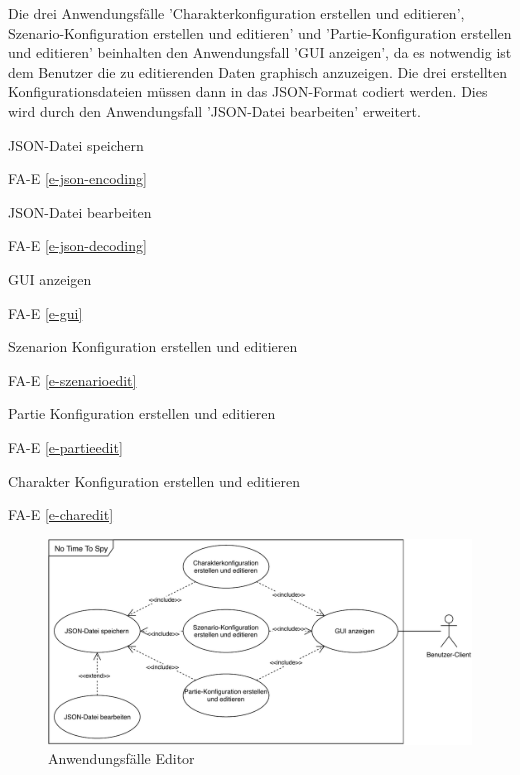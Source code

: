 Die drei Anwendungsfälle 'Charakterkonfiguration erstellen und editieren', Szenario-Konfiguration erstellen und editieren' und 'Partie-Konfiguration erstellen und editieren' beinhalten den Anwendungsfall 'GUI anzeigen', da es notwendig ist dem Benutzer die zu editierenden Daten graphisch anzuzeigen. Die drei erstellten Konfigurationsdateien müssen dann in das JSON-Format codiert werden. Dies wird durch den Anwendungsfall 'JSON-Datei bearbeiten' erweitert.


JSON-Datei speichern

FA-E \ref{e-json-encoding} %

JSON-Datei bearbeiten

FA-E \ref{e-json-decoding} %

GUI anzeigen

FA-E \ref{e-gui} %

Szenarion Konfiguration erstellen und editieren

FA-E \ref{e-szenarioedit} %

Partie Konfiguration erstellen und editieren

FA-E \ref{e-partieedit} %

Charakter Konfiguration erstellen und editieren

FA-E \ref{e-charedit} %

\begin{figure}
  \centering
  \includegraphics[width=\textwidth]{Meilenstein02/use_case_editor.pdf}
  \caption{Anwendungsfälle Editor}
\end{figure}